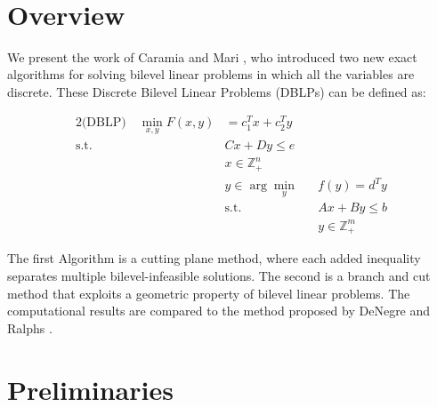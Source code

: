 \documentclass{article}
\title{
	\centering
	{\huge\textbf{\Title}}\\ 
	\vspace{1cm}
	{\huge{\Seminar}\\}
	\vspace{0.6cm} 
	{\mdseries\large \Author }
	\vspace{1cm}
}
\begin{document}
	
	\maketitle
	\vspace{1cm}
\section{Overview}

We present the work of Caramia and Mari \cite{Caramia2015}, who introduced two new exact algorithms for solving bilevel linear problems in which all the variables are discrete. These Discrete Bilevel Linear Problems (DBLPs) can be defined as:

		\begin{alignat*}{2}
		\text{(DBLP)} \quad \min_{x,y} F(x,y) &= c_1^Tx +c_2^Ty&& \\
		\text{s.t.} \quad &Cx + Dy \le e&& \\
		&x \in \mathbb{Z}^n_+ \\
		&y \in \arg \min_y&& f(y) = d^T y \\
		&\text{s.t.} &&Ax+By \le b \\
		& &&y \in \mathbb{Z}^m_+
		\end{alignat*}
		
The first Algorithm is a cutting plane method, where each added inequality separates multiple bilevel-infeasible solutions. The second is a branch and cut method that exploits a geometric property of bilevel linear problems. 
The computational results are compared to the method proposed by DeNegre and Ralphs \cite{DeNegre2009}.
\newpage

\section{Preliminaries}
\end{document}
